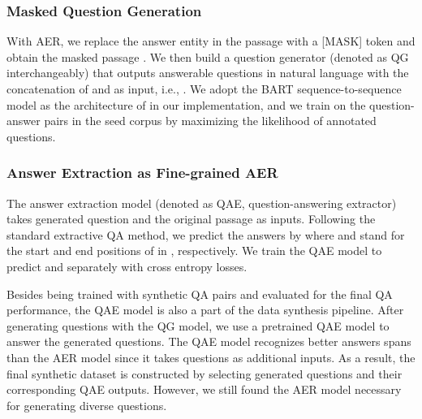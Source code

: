 \documentclass[11pt,a4paper]{article}
\begin{document}
\subsubsection{Masked Question Generation}
With AER, we replace the answer entity  in the passage  with a [MASK] token and obtain the masked passage . We then build a question generator  (denoted as QG interchangeably) that outputs answerable questions  in natural language with the concatenation of  and  as input, i.e., .
We adopt the BART sequence-to-sequence model \cite{lewis2019bart} as the architecture of  in our implementation, and we train  on the question-answer pairs in the seed corpus by maximizing the likelihood of annotated questions.

\subsubsection{Answer Extraction as Fine-grained AER}
The answer extraction model  (denoted as QAE, question-answering extractor) takes generated question  and the original passage  as inputs. Following the standard extractive QA method, we predict the answers by
where  and  stand for the start and end positions of  in , respectively. We train the QAE model to predict  and  separately with cross entropy losses.

Besides being trained with synthetic QA pairs and evaluated for the final QA performance, the QAE model is also a part of the data synthesis pipeline. After generating questions with the QG model, we use a pretrained QAE model to answer the generated questions. The QAE model recognizes better answers spans than the AER model since it takes questions as additional inputs. As a result, the final synthetic dataset is constructed by selecting generated questions and their corresponding QAE outputs. However, we still found the AER model necessary for generating diverse questions.
\end{document}
